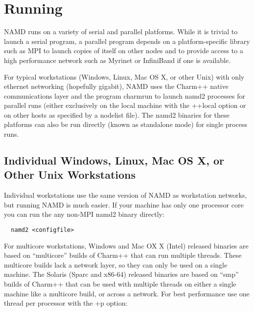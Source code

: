 
\section{Running \NAMD}
\label{section:run}

NAMD runs on a variety of serial and parallel platforms.  While it is
trivial to launch a serial program, a parallel program depends on a
platform-specific library such as MPI to launch copies of itself on
other nodes and to provide access to a high performance network such
as Myrinet or InfiniBand if one is available.

For typical workstations (Windows, Linux, Mac OS X, or other Unix)
with only ethernet networking (hopefully gigabit), NAMD uses the
Charm++ native communications layer and the program charmrun to launch
namd2 processes for parallel runs (either exclusively on the local
machine with the ++local option or on other hosts as specified by a
nodelist file).  The namd2 binaries for these platforms can also be
run directly (known as standalone mode) for single process runs.

\subsection{Individual Windows, Linux, Mac OS X, or Other Unix Workstations}

Individual workstations use the same version of NAMD as workstation
networks, but running NAMD is much easier.  If your machine has only
one processor core you can run the any non-MPI namd2 binary directly:

\begin{verbatim}
  namd2 <configfile>
\end{verbatim}

For multicore workstations, Windows and Mac OX X (Intel) released binaries
are based on ``multicore'' builds of Charm++ that can run multiple threads.
These multicore builds lack a network layer, so they can only be used on a
single machine.
The Solaris (Sparc and x86-64) released binaries are based on ``smp''
builds of Charm++ that can be used with multiple threads on either a
single machine like a multicore build, or across a network.
For best performance use one thread per processor with the +p option:

